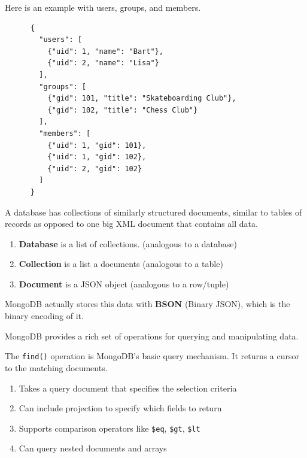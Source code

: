 \documentclass{article}
\begin{document}
  \begin{example}
    Here is an example with users, groups, and members. 
    \begin{lstlisting}
      {
        "users": [
          {"uid": 1, "name": "Bart"},
          {"uid": 2, "name": "Lisa"}
        ],
        "groups": [
          {"gid": 101, "title": "Skateboarding Club"},
          {"gid": 102, "title": "Chess Club"}
        ],
        "members": [
          {"uid": 1, "gid": 101},
          {"uid": 1, "gid": 102},
          {"uid": 2, "gid": 102}
        ]
      } 
    \end{lstlisting}
  \end{example}

  \begin{definition}
    A database has collections of similarly structured documents, similar to tables of records as opposed to one big XML document that contains all data.  
    \begin{enumerate}
      \item \textbf{Database} is a list of collections. (analogous to a database)
      \item \textbf{Collection} is a list a documents (analogous to a table)
      \item \textbf{Document} is a JSON object (analogous to a row/tuple)
    \end{enumerate}
    MongoDB actually stores this data with \textbf{BSON} (Binary JSON), which is the binary encoding of it. 
  \end{definition}  

  MongoDB provides a rich set of operations for querying and manipulating data. 

  \begin{definition}[find()]
    The \texttt{find()} operation is MongoDB's basic query mechanism. It returns a cursor to the matching documents.
    \begin{enumerate}
      \item Takes a query document that specifies the selection criteria
      \item Can include projection to specify which fields to return
      \item Supports comparison operators like \texttt{\$eq}, \texttt{\$gt}, \texttt{\$lt}
      \item Can query nested documents and arrays
    \end{enumerate}
  \end{definition}
\end{document}
